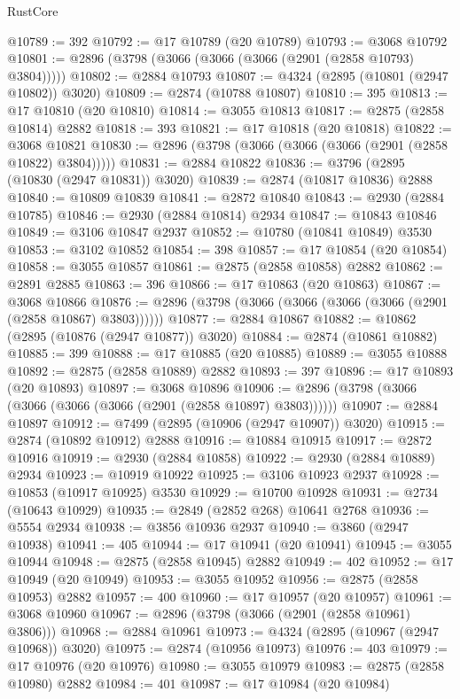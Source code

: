 \begin{lexlean}{RustCore}
\begin{coremodule}
@10789 := 392
@10792 := @17 @10789 (@20 @10789)
@10793 := @3068 @10792
@10801 := @2896 (@3798 (@3066 (@3066 (@3066 (@2901 (@2858 @10793) @3804)))))
@10802 := @2884 @10793
@10807 := @4324 (@2895 (@10801 (@2947 @10802)) @3020)
@10809 := @2874 (@10788 @10807)
@10810 := 395
@10813 := @17 @10810 (@20 @10810)
@10814 := @3055 @10813
@10817 := @2875 (@2858 @10814) @2882
@10818 := 393
@10821 := @17 @10818 (@20 @10818)
@10822 := @3068 @10821
@10830 := @2896 (@3798 (@3066 (@3066 (@3066 (@2901 (@2858 @10822) @3804)))))
@10831 := @2884 @10822
@10836 := @3796 (@2895 (@10830 (@2947 @10831)) @3020)
@10839 := @2874 (@10817 @10836) @2888
@10840 := @10809 @10839
@10841 := @2872 @10840
@10843 := @2930 (@2884 @10785)
@10846 := @2930 (@2884 @10814) @2934
@10847 := @10843 @10846
@10849 := @3106 @10847 @2937
@10852 := @10780 (@10841 @10849) @3530
@10853 := @3102 @10852
@10854 := 398
@10857 := @17 @10854 (@20 @10854)
@10858 := @3055 @10857
@10861 := @2875 (@2858 @10858) @2882
@10862 := @2891 @2885
@10863 := 396
@10866 := @17 @10863 (@20 @10863)
@10867 := @3068 @10866
@10876 := @2896 (@3798 (@3066 (@3066 (@3066 (@3066 (@2901 (@2858 @10867) @3803))))))
@10877 := @2884 @10867
@10882 := @10862 (@2895 (@10876 (@2947 @10877)) @3020)
@10884 := @2874 (@10861 @10882)
@10885 := 399
@10888 := @17 @10885 (@20 @10885)
@10889 := @3055 @10888
@10892 := @2875 (@2858 @10889) @2882
@10893 := 397
@10896 := @17 @10893 (@20 @10893)
@10897 := @3068 @10896
@10906 := @2896 (@3798 (@3066 (@3066 (@3066 (@3066 (@2901 (@2858 @10897) @3803))))))
@10907 := @2884 @10897
@10912 := @7499 (@2895 (@10906 (@2947 @10907)) @3020)
@10915 := @2874 (@10892 @10912) @2888
@10916 := @10884 @10915
@10917 := @2872 @10916
@10919 := @2930 (@2884 @10858)
@10922 := @2930 (@2884 @10889) @2934
@10923 := @10919 @10922
@10925 := @3106 @10923 @2937
@10928 := @10853 (@10917 @10925) @3530
@10929 := @10700 @10928
@10931 := @2734 (@10643 @10929)
@10935 := @2849 (@2852 @268) @10641 @2768
@10936 := @5554 @2934
@10938 := @3856 @10936 @2937
@10940 := @3860 (@2947 @10938)
@10941 := 405
@10944 := @17 @10941 (@20 @10941)
@10945 := @3055 @10944
@10948 := @2875 (@2858 @10945) @2882
@10949 := 402
@10952 := @17 @10949 (@20 @10949)
@10953 := @3055 @10952
@10956 := @2875 (@2858 @10953) @2882
@10957 := 400
@10960 := @17 @10957 (@20 @10957)
@10961 := @3068 @10960
@10967 := @2896 (@3798 (@3066 (@2901 (@2858 @10961) @3806)))
@10968 := @2884 @10961
@10973 := @4324 (@2895 (@10967 (@2947 @10968)) @3020)
@10975 := @2874 (@10956 @10973)
@10976 := 403
@10979 := @17 @10976 (@20 @10976)
@10980 := @3055 @10979
@10983 := @2875 (@2858 @10980) @2882
@10984 := 401
@10987 := @17 @10984 (@20 @10984)

\end{coremodule}
\end{lexlean}
